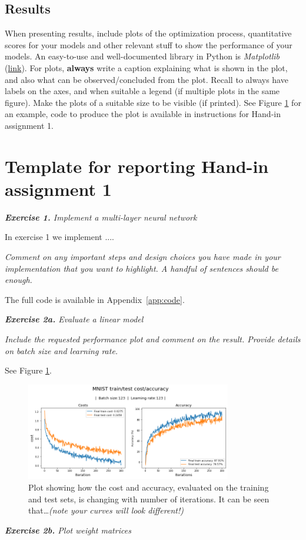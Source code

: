 \documentclass[a4paper,10pt]{article}
\begin{document}
	\subsection*{Results}
	When presenting results, include plots of the optimization process, quantitative scores for your models and other relevant stuff to show the performance of your models. An easy-to-use and well-documented library in Python is \emph{Matplotlib} (\href{https://matplotlib.org/}{link}). 
	For plots, \textbf{always} write a caption explaining what is shown in the plot, and also what can be observed/concluded from the plot. Recall to always have labels on the axes, and when suitable a legend (if multiple plots in the same figure). Make the plots of a suitable size to be visible (if printed). See Figure \ref{fig:cost_per_iteration_linear} for an example, code to produce the plot is available in instructions for Hand-in assignment 1.
	
	
	
	\pagebreak
	
	\section{Template for reporting Hand-in assignment 1}
	\label{sec:template-HA1}
	
	\hfill \break
	\textit{\textbf{Exercise 1.} Implement a multi-layer neural network}
	
	In exercise 1 we implement ....
	
	\textit{Comment on any important steps and design choices you have made in your implementation that you want to highlight. A handful of sentences should be enough.}
	
	The full code is available in Appendix~\ref{app:code}.
	
	\hfill \break
	\textit{\textbf{Exercise 2a.} Evaluate a linear model}
	
	\textit{Include the requested performance plot and comment on the result.
	Provide details on batch size and learning rate.} 

	See Figure \ref{fig:cost_per_iteration_linear}.
	
	\begin{figure}[H]
		\centering
		\includegraphics[width=0.8\textwidth]{cost_accuracy_per_iteration.png}
		\caption{Plot showing how the cost and accuracy, evaluated on the training and test sets, is changing with number of iterations. It can be seen that\ldots \textit{(note your curves will look different!)}}
		\label{fig:cost_per_iteration_linear}
	\end{figure}
	\hfill \break
	\textit{\textbf{Exercise 2b.} Plot weight matrices}
	
\end{document}
